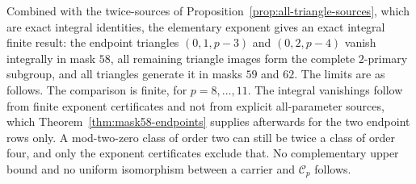 \documentclass[11pt]{article}
\theoremstyle{definition}
\theoremstyle{remark}
\begin{document}
Combined with the twice-sources of Proposition~\ref{prop:all-triangle-sources}, which are
exact integral identities, the elementary exponent gives an exact integral finite result: the
endpoint triangles $(0,1,p-3)$ and $(0,2,p-4)$ vanish integrally in mask $58$, all remaining
triangle images form the complete $2$-primary subgroup, and all triangles generate it in
masks $59$ and $62$. The limits are as follows. The comparison is finite, for $p=8,\ldots,11$.
The integral vanishings follow from finite exponent certificates and not from explicit
all-parameter sources, which Theorem~\ref{thm:mask58-endpoints} supplies afterwards for
the two endpoint rows only. A mod-two-zero class of order two can still be twice a class of
order four, and only the exponent certificates exclude that. No complementary upper bound and no
uniform isomorphism between a carrier and $\mathcal C_p$ follows.
\end{document}
